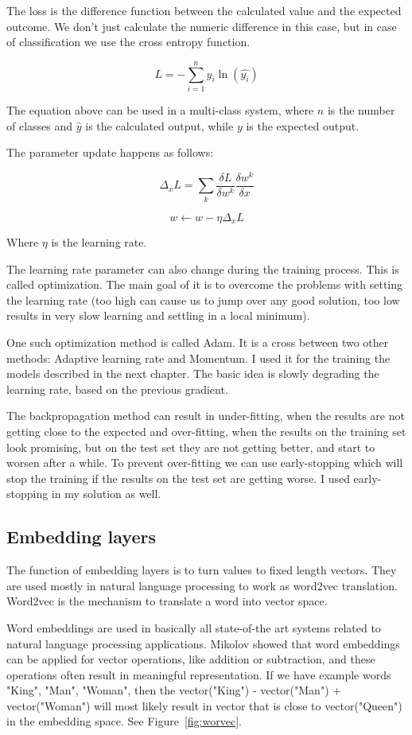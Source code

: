 The loss is the difference function between the calculated value and the expected outcome. We don't just calculate the numeric difference in this case, but in case of classification we use the cross entropy function.

\[L = - \sum_{i=1}^{n} y_i \ln(\hat{y_i})\]

The equation above can be used in a multi-class system, where \(n\) is the number of classes and \(\hat{y}\) is the calculated output, while \(y\) is the expected output.

The parameter update happens as follows:

\[\Delta_x L = \sum_{k} \frac{\delta L}{\delta w^k}\frac{\delta w^k}{\delta x}\]

\[w \leftarrow w - \eta \Delta_x L\]

Where \(\eta\) is the learning rate.

The learning rate parameter can also change during the training process. This is called optimization. The main goal of it is to overcome the problems with setting the learning rate (too high can cause us to jump over any good solution, too low results in very slow learning and settling in a local minimum).

One such optimization method is called Adam. It is a cross between two other methods: Adaptive learning rate and Momentum. I used it for the training the models described in the next chapter. The basic idea is slowly degrading the learning rate, based on the previous gradient.

The backpropagation method can result in under-fitting, when the results are not getting close to the expected and over-fitting, when the results on the training set look promising, but on the test set they are not getting better, and start to worsen after a while. To prevent over-fitting we can use early-stopping which will stop the training if the results on the test set are getting worse. I used early-stopping in my solution as well.

\subsection{Embedding layers}

The function of embedding layers is to turn values to fixed length vectors. They are used mostly in natural language processing to work as word2vec translation. Word2vec is the mechanism to translate a word into vector space.\cite{Word2Vec}

Word embeddings are used in basically all state-of-the art systems related to
natural language processing applications. Mikolov\cite{Mikolov:2013x} showed that word embeddings can be applied for vector operations, like addition or subtraction, and these operations often result in meaningful representation. If we have example words "King", "Man", "Woman", then the vector("King") - vector("Man") + vector("Woman") will most likely result in vector that is close to vector("Queen") in the embedding space. See Figure~\ref{fig:worvec}.

